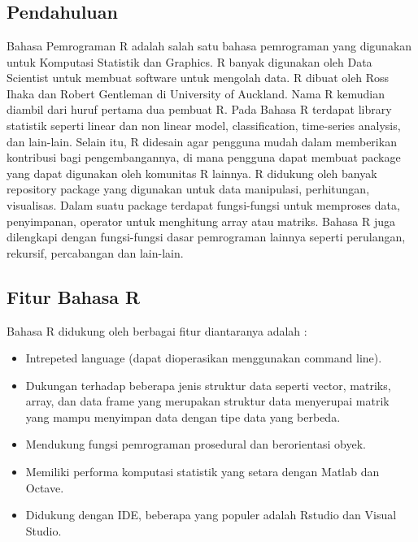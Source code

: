 \chapter{\topikSatu}

\section{Pendahuluan}

Bahasa Pemrograman R adalah salah satu bahasa pemrograman yang digunakan untuk Komputasi Statistik dan Graphics. R banyak digunakan oleh Data Scientist untuk membuat software untuk mengolah data. R dibuat oleh Ross Ihaka dan Robert Gentleman di University of Auckland. Nama  R kemudian diambil dari huruf pertama  dua pembuat R.
Pada Bahasa R terdapat library statistik seperti linear dan non linear model, classification, time-series­ analysis, dan lain-lain. Selain itu, R didesain agar pengguna mudah dalam memberikan kontribusi bagi pengembangannya, di mana pengguna dapat membuat package yang dapat digunakan oleh komunitas R lainnya.
R didukung oleh banyak repository package  yang digunakan untuk data manipulasi, perhitungan, visualisas. Dalam suatu package terdapat fungsi-fungsi untuk memproses data, penyimpanan, operator untuk menghitung array atau matriks. Bahasa R juga dilengkapi dengan fungsi-fungsi dasar pemrograman lainnya seperti perulangan, rekursif, percabangan dan lain-lain. 

\section{Fitur Bahasa R}

Bahasa R didukung oleh berbagai fitur diantaranya adalah :
\begin{itemize} 
\item Intrepeted language (dapat dioperasikan menggunakan command line).
\item Dukungan terhadap beberapa jenis struktur data seperti vector, matriks, array, dan data frame yang merupakan struktur data menyerupai matrik yang mampu menyimpan data dengan tipe data yang berbeda.
\item Mendukung fungsi pemrograman prosedural dan berorientasi obyek.
\item Memiliki performa komputasi statistik yang setara dengan Matlab dan Octave.
\item Didukung dengan IDE, beberapa yang populer adalah Rstudio dan Visual Studio.
\end{itemize}

